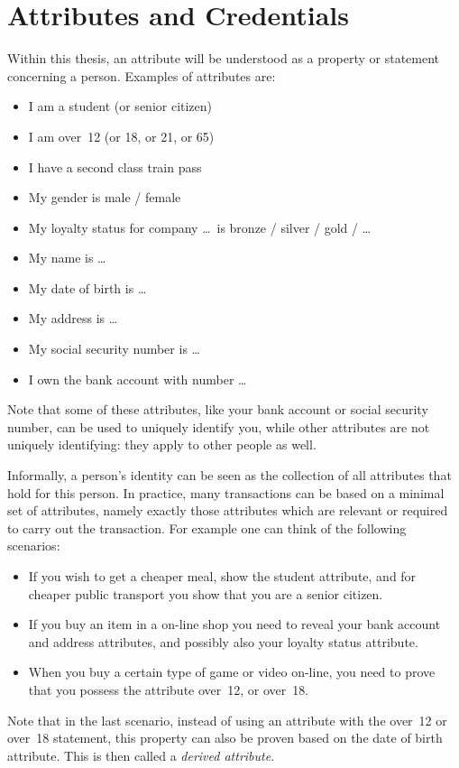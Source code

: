 \section{Attributes and Credentials}

Within this thesis, an attribute will be understood as a
property or statement concerning a person. Examples of attributes are:
\begin{multicols}{2}
\begin{itemize}
  \item I am a \textsf{student} (or \textsf{senior citizen})
  \item I am \textsf{over~12} (or \textsf{18}, or \textsf{21}, or \textsf{65})
  \item I have a \textsf{second class train pass}
  \item My \textsf{gender} is \textsf{male / female}
  \item My \textsf{loyalty status} for company \dots\ is \textsf{bronze / silver / gold / \dots}
  \item My \textsf{name} is \dots
  \item My \textsf{date of birth} is \dots
  \item My \textsf{address} is \dots
  \item My \textsf{social security number} is \dots
  \item I own the \textsf{bank account} with number \dots
\end{itemize}
\end{multicols}

Note that some of these attributes, like your bank account or social security
number, can be used to uniquely identify you, while other attributes are not
uniquely identifying: they apply to other people as well.

Informally, a person's identity can be seen as the collection
of all attributes that hold for this person. In practice, many transactions can
be based on a minimal set of attributes, namely exactly those attributes which
are relevant or required to carry out the transaction. For example one can think
of the following scenarios:
\begin{itemize}
  \item If you wish to get a cheaper meal, show the \textsf{student} attribute,
    and for cheaper public transport you show that you are a \textsf{senior
    citizen}.
  \item If you buy an item in a on-line shop you need to reveal your
    \textsf{bank account} and \textsf{address} attributes, and possibly also
    your \textsf{loyalty status} attribute.
  \item When you buy a certain type of game or video on-line, you need to
    prove that you possess the attribute \textsf{over~12}, or \textsf{over~18}.
\end{itemize}
Note that in the last scenario, instead of using an attribute with the
\textsf{over~12} or \textsf{over~18} statement, this property can also be
proven based on the \textsf{date of birth} attribute. This is then called a
\emph{derived attribute}.

